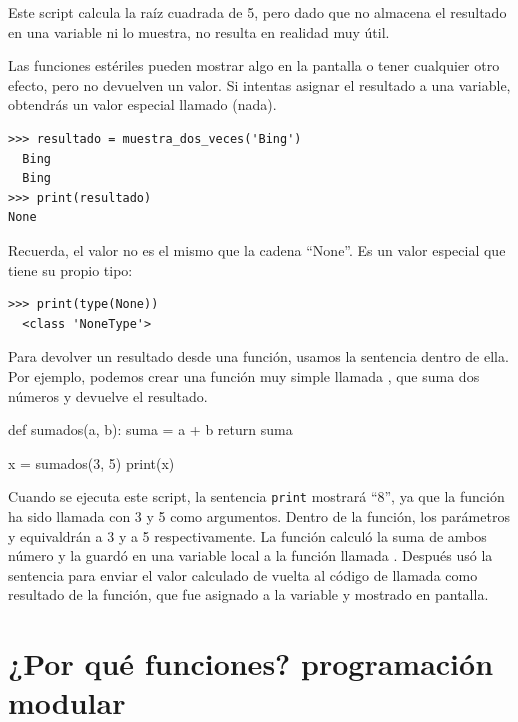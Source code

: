 Este script calcula la raíz cuadrada de 5, pero dado que no almacena el
resultado en una variable ni lo muestra, no resulta en realidad muy
útil.

 

Las funciones estériles pueden mostrar algo en la pantalla o tener
cualquier otro efecto, pero no devuelven un valor. Si intentas asignar
el resultado a una variable, obtendrás un valor especial llamado
 (nada).

 

\begin{Verbatim}[frame=single]
>>> resultado = muestra_dos_veces('Bing')
  Bing
  Bing
>>> print(resultado)
None
\end{Verbatim}

Recuerda, el valor  no es el mismo que la cadena ``None''. Es un valor especial que tiene su propio tipo:

\begin{Verbatim}[frame=single]
>>> print(type(None))
  <class 'NoneType'>
\end{Verbatim}

Para devolver un resultado desde una función, usamos la sentencia
 dentro de ella. Por ejemplo, podemos crear una función
muy simple llamada , que suma dos números y devuelve el
resultado.

\begin{python}[frame=single]
def sumados(a, b):
    suma = a + b
    return suma

x = sumados(3, 5)
print(x)
\end{python}

Cuando se ejecuta este script, la sentencia \texttt{print} mostrará
``8'', ya que la función  ha sido llamada con 3 y 5 como
argumentos. Dentro de la función, los parámetros  y 
equivaldrán a 3 y a 5 respectivamente. La función calculó la suma de
ambos número y la guardó en una variable local a la función llamada
. Después usó la sentencia  para enviar el
valor calculado de vuelta al código de llamada como resultado de la
función, que fue asignado a la variable  y mostrado en
pantalla.

\hypertarget{por-quuxe9-funciones}{%
\section{¿Por qué funciones? programación modular}\label{por-quuxe9-funciones}}


